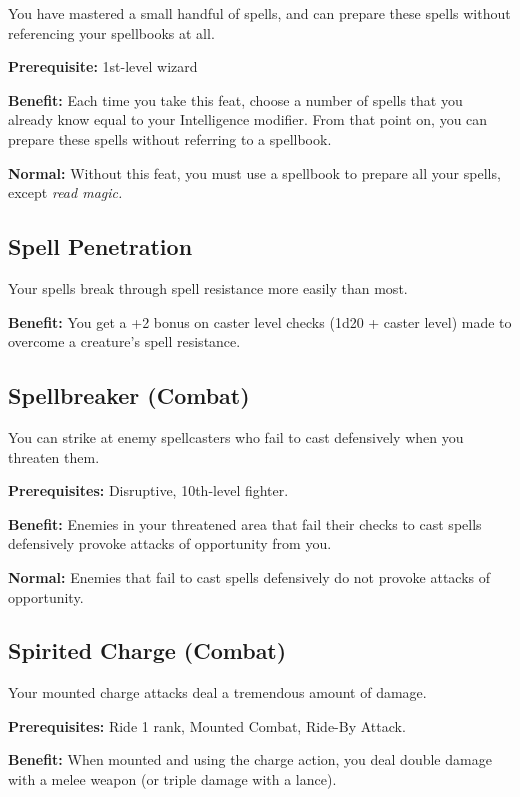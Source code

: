 				
You have mastered a small handful of spells, and can prepare these spells without referencing your spellbooks at all.
				
\textbf{Prerequisite:} 1st-level wizard
				
\textbf{Benefit:} Each time you take this feat, choose a number of spells that you already know equal to your Intelligence modifier. From that point on, you can prepare these spells without referring to a spellbook.
				
\textbf{Normal:} Without this feat, you must use a spellbook to prepare all your spells, except \textit{read magic.}
				
\subsection{Spell Penetration}

				
Your spells break through spell resistance more easily than most.
				
\textbf{Benefit:} You get a +2 bonus on caster level checks (1d20 + caster level) made to overcome a creature's spell resistance.
				
\subsection{Spellbreaker (Combat)}

				
You can strike at enemy spellcasters who fail to cast defensively when you threaten them.
				
\textbf{Prerequisites:} Disruptive, 10th-level fighter.
				
\textbf{Benefit:} Enemies in your threatened area that fail their checks to cast spells defensively provoke attacks of opportunity from you.
				
\textbf{Normal:} Enemies that fail to cast spells defensively do not provoke attacks of opportunity.
				
\subsection{Spirited Charge (Combat)}

				
Your mounted charge attacks deal a tremendous amount of damage.
				
\textbf{Prerequisites:} Ride 1 rank, Mounted Combat, Ride-By Attack.
				
\textbf{Benefit:} When mounted and using the charge action, you deal double damage with a melee weapon (or triple damage with a lance).
				
